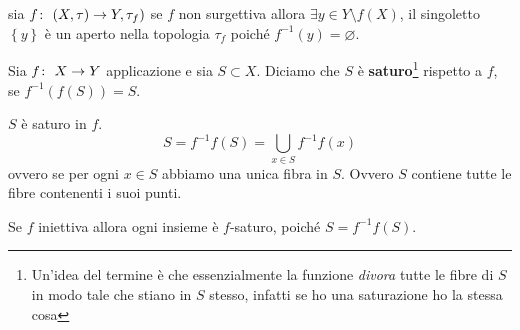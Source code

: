 \begin{remark}
	sia $f \colon\ (X, \tau) \rightarrow Y, \tau_f)$ se $f$ non surgettiva allora $\exists y \in Y \setminus f(X)$, il singoletto $\left\{y\right\}$ è un aperto nella topologia $\tau_f$ poiché $f^{-1}(y) = \varnothing$.
\end{remark} 

\begin{definition}
	Sia $f \colon\ X \rightarrow Y$ applicazione e sia $S \subset X$. Diciamo che $S$ è \textbf{saturo}\footnote{Un'idea del termine è che essenzialmente la funzione \textit{divora} tutte le fibre di $S$ in modo tale che stiano in $S$ stesso, infatti se ho una saturazione ho la stessa cosa} rispetto a $f$, se $f^{-1}(f(S)) = S$.
\end{definition} 

\begin{remark}
	$S$ è saturo in $f$.
	\begin{equation*}
		S = f^{-1}f(S) = \bigcup_{x \in S} f^{-1}f(x)
	\end{equation*}
	ovvero se per ogni $x \in S$ abbiamo una unica fibra in $S$. Ovvero $S$ contiene tutte le fibre contenenti i suoi punti. 
\end{remark} 

\begin{remark}
	Se $f$ iniettiva allora ogni insieme è $f$-saturo, poiché $S = f^{-1}f(S)$.
\end{remark}


